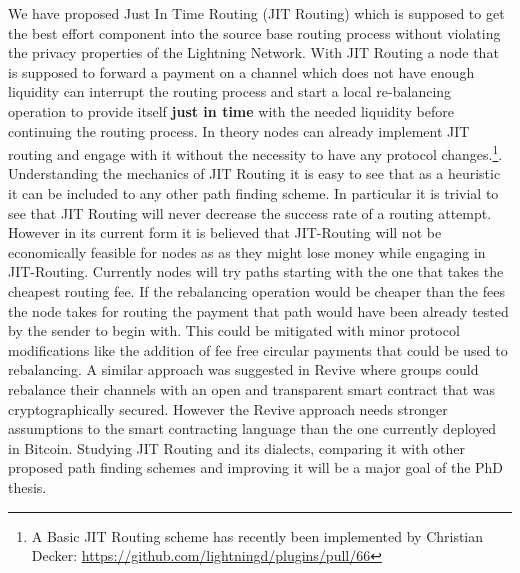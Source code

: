\documentclass[a4paper]{paper}
\begin{document}
We have proposed Just In Time Routing (JIT Routing) \cite{pickhardt2019jit} which is supposed to get the best effort component into the source base routing process without violating the privacy properties of the Lightning Network.
With JIT Routing a node that is supposed to forward a payment on a channel which does not have enough liquidity can interrupt the routing process and start a local re-balancing operation to provide itself \textbf{just in time} with the needed liquidity before continuing the routing process.
In theory nodes can already implement JIT routing and engage with it without the necessity to have any protocol changes.\footnote{A Basic JIT Routing scheme has recently been implemented by Christian Decker: \url{https://github.com/lightningd/plugins/pull/66}}.
Understanding the mechanics of JIT Routing it is easy to see that as a heuristic it can be included to any other path finding scheme.
In particular it is trivial to see that JIT Routing will never decrease the success rate of a routing attempt.
However in its current form it is believed that JIT-Routing will not be economically feasible for nodes as as they might lose money while engaging in JIT-Routing.
Currently nodes will try paths starting with the one that takes the cheapest routing fee.
If the rebalancing operation would be cheaper than the fees the node takes for routing the payment that path would have been already tested by the sender to begin with.
This could be mitigated with minor protocol modifications like the addition of fee free circular payments that could be used to rebalancing.
A similar approach was suggested in Revive \cite{khalil2017revive} where groups could rebalance their channels with an open and transparent smart contract that was cryptographically secured.
However the Revive approach needs stronger assumptions to the smart contracting language than the one currently deployed in Bitcoin.
Studying JIT Routing and its dialects, comparing it with other proposed path finding schemes and improving it will be a major goal of the PhD thesis. 
\end{document}
